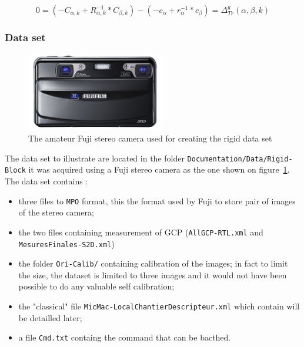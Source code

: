 \begin{equation}
     0 = (- C_{\alpha,k}  + R_{\alpha,k}^{-1} * C_{\beta,k}) -(- c_{\alpha}  + r_{\alpha}^{-1} * c_{\beta})
      = \Delta^g_{Tr}(\alpha,\beta,k)
     \label{EQ:RIG5}
\end{equation}


\subsubsection{Data set}

\begin{figure}
\begin{center}
   \includegraphics[width=60mm]{FIGS/Rigid-Block/Fuji.jpg}
\end{center}
\caption{The amateur Fuji stereo camera used for  creating the rigid data set}
\label{ImFuji}
\end{figure}

The data set to illustrate are located in the folder {\tt Documentation/Data/Rigid-Block} it was acquired using
a Fuji stereo camera as the one shown on figure~\ref{ImFuji}. The data set contains :

\begin{itemize}
    \item three files to {\tt MPO}  format, this the format used by Fuji to store pair of images of the stereo camera;
    \item the two files containing measurement of GCP ({\tt AllGCP-RTL.xml} and {\tt MesuresFinales-S2D.xml})
    \item the folder {\tt Ori-Calib/} containing calibration of the images; in fact to limit the size, the dataset
          is limited to three images and it would not have been possible to do any valuable self calibration;

    \item the "classical" file {\tt MicMac-LocalChantierDescripteur.xml} which contain will be detailled later;
    \item a file {\tt Cmd.txt} containg the command that can be bacthed.
\end{itemize}


